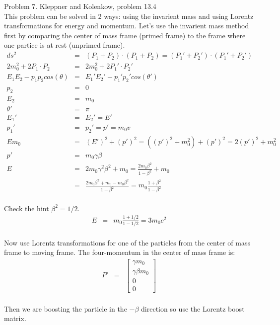 \documentclass[11pt]{amsart}
\begin{document}
Problem 7. Kleppner and Kolenkow, problem 13.4 \\
This problem can be solved in 2 ways: using the invarient mass and using Lorentz transformations for energy and momentum. Let's use the invarient mass method first by comparing the center of mass frame (primed frame) to the frame where one partice is at rest (unprimed frame). \\
\begin{eqnarray*} 
ds^{2} &=& (P_{1}+P_{2})\cdot{(P_{1}+P_{2})} =  (P_{1}'+P_{2}')\cdot{(P_{1}'+P_{2}')} \\
2m_{0}^{2}+2P_{1}\cdot{P_{2}} &=& 2m_{0}^{2}+2P_{1}'\cdot{P_{2}'} \\
E_{1}E_{2}-p_{1}p_{2}cos(\theta) &=& E_{1}'E_{2}'-p_{1}'p_{2}'cos(\theta') \\
p_{2} &=& 0 \\
E_{2} &=& m_{0} \\
\theta' &=& \pi \\
E_{1}' &=& E_{2}' = E' \\
p_{1}' &=& p_{2}' = p' = m_{0}v \\
Em_{0} &=& (E')^{2}+(p')^{2} = ((p')^{2}+m_{0}^{2})+(p')^{2} = 2(p')^{2}+m_{0}^{2} \\
p' &=& m_{0}\gamma\beta \\
E &=& 2m_{0}\gamma^{2}\beta^{2}+m_{0}  = \frac{2m_{0}\beta^{2}}{1-\beta^{2}}+m_{0} \\
&=& \frac{2m_{0}\beta^{2}+m_{0}-m_{0}\beta^{2}}{1-\beta^{2}} = m_{0}\frac{1+\beta^{2}}{1-\beta^{2}} 
\end{eqnarray*} \\
Check the hint $\beta^{2}=1/2$. \\
\begin{eqnarray*}
E &=& m_{0}\frac{1+1/2}{1-1/2} = 3m_{0}c^{2} 
\end{eqnarray*} \\
Now use Lorentz transformations for one of the particles from the center of mass frame to moving frame. The four-momentum in the center of mass frame is: \\
\begin{eqnarray*} 
P' &=& \begin{bmatrix}
	\gamma{m_{0}} \\
	\gamma\beta{m_{0}} \\
	0 \\
	0 
	\end{bmatrix}
\end{eqnarray*} \\
Then we are boosting the particle in the $-\beta$ direction so use the Lorentz boost matrix. \\
\end{document}
